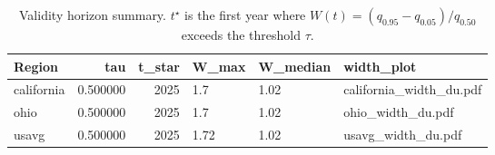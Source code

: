 \begin{table}
\caption{Validity horizon summary. $t^\star$ is the first year where $W(t)=(q_{0.95}-q_{0.05})/q_{0.50}$ exceeds the threshold $\tau$.}
\label{tab:validity-horizon}
\begin{tabular}{lrrlll}
\toprule
Region & tau & t\_star & W\_max & W\_median & width\_plot \\
\midrule
california & 0.500000 & 2025 & 1.7 & 1.02 & california\_width\_du.pdf \\
ohio & 0.500000 & 2025 & 1.7 & 1.02 & ohio\_width\_du.pdf \\
usavg & 0.500000 & 2025 & 1.72 & 1.02 & usavg\_width\_du.pdf \\
\bottomrule
\end{tabular}
\end{table}
